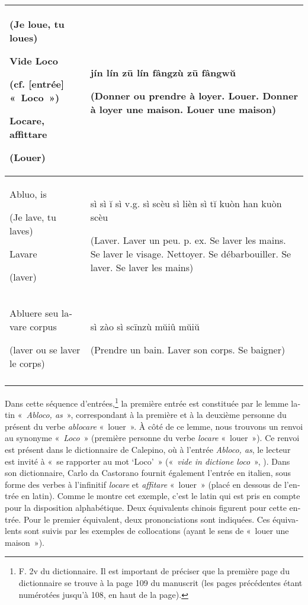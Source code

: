 \documentclass[output=paper,colorlinks,citecolor=brown,arabicfont,chinesefont,booklanguage=french]{langscibook}
\begin{document}
\begin{otherlanguage}{french}
\begin{table}
\begin{tabularx}{\linewidth}{QQ}
\footnotesize (Je loue, tu loues)

\normalsize Vide Loco 

\footnotesize (cf. [entrée] «~Loco~»)

\normalsize Locare, affittare 

\footnotesize (Louer) & \normalsize {}

jín lín  zū    lín fângzù   zū fângwŭ

\footnotesize (Donner ou prendre à loyer. Louer. Donner à loyer une maison. Louer une maison) \\
\hline
 Abluo, is 
 
\footnotesize (Je lave, tu laves)

\normalsize Lavare

\footnotesize (laver) & {}

\normalsize sì     sì ĭ  sì     v.g. sì scèu  sì lièn    sì tĭ     kuòn   han    kuòn scèu

\footnotesize (Laver. Laver un peu.  p. ex. Se laver les mains. Se laver le visage. Nettoyer. Se débarbouiller.  Se laver. Se laver les mains) \\
\hline
 Abluere seu lavare corpus
 
\footnotesize (laver ou se laver le corps) & {}

\normalsize sì zào    sì scīnzù     mŭiû mŭiŭ

\footnotesize (Prendre un bain. Laver son corps. Se baigner) \\
\lspbottomrule
\end{tabularx}
\end{table}

Dans cette séquence d’entrées,\footnote{F. 2v du dictionnaire. Il est important de préciser que la première page du dictionnaire se trouve à la page 109 du manuscrit (les pages précédentes étant numérotées jusqu’à 108, en haut de la page).} la première entrée est constituée par le lemme latin «~\emph{Abloco, as}~», correspondant à la première et à la deuxième personne du présent du verbe \emph{ablocare} «~louer~». À côté de ce lemme, nous trouvons un renvoi au synonyme «~\emph{Loco}~» (première personne du verbe \emph{locare} «~louer~»). Ce renvoi est présent dans le dictionnaire de Calepino, où à l’entrée \emph{Abloco, as}, le lecteur est invité à «~se rapporter au mot ‘Loco’~» («~\emph{vide in dictione loco}~», \citealt[3]{Calepino1513}). Dans son dictionnaire, Carlo da Castorano fournit également l’entrée en italien, sous forme des verbes à l’infinitif \emph{locare} et \emph{affitare} «~louer~» (placé en dessous de l’entrée en latin). Comme le montre cet exemple, c’est le latin qui est pris en compte pour la disposition alphabétique. Deux équivalents chinois figurent pour cette entrée. Pour le premier équivalent, deux prononciations sont indiquées. Ces équivalents sont suivis par les exemples de collocations (ayant le sens de «~louer une maison~»).


\end{otherlanguage}
\end{document}
